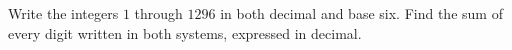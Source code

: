 Write the integers $1$ through $1296$ in both decimal and base six. Find the sum of every digit written in both systems, expressed in decimal.
